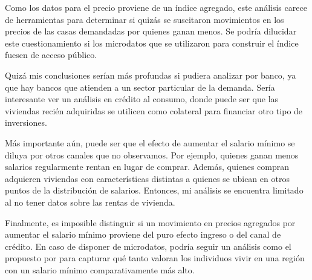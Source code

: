 Como los datos para el precio proviene de un índice agregado, este análisis carece de herramientas para determinar si quizás se suscitaron  movimientos en los precios de las casas demandadas por quienes ganan menos. Se podría dilucidar este cuestionamiento   si los microdatos que se utilizaron para construir el índice fuesen de acceso público.

Quizá mis conclusiones serían más profundas si pudiera analizar por banco, ya que hay bancos que atienden a un sector particular de la demanda. Sería interesante ver un análisis en crédito al consumo, donde puede ser que las viviendas recién adquiridas se utilicen como colateral para financiar otro tipo de inversiones.

Más importante aún, puede ser que el efecto de aumentar el salario mínimo se diluya por otros canales que no observamos. Por ejemplo, quienes ganan menos salarios regularmente rentan en lugar de comprar. Además, quienes compran adquieren viviendas con características distintas a quienes se ubican en otros puntos de la distribución de salarios. Entonces, mi análisis se encuentra limitado al no tener datos sobre las rentas de vivienda.

Finalmente, es imposible distinguir si un movimiento en precios agregados por aumentar el salario mínimo proviene del puro efecto ingreso o del canal de crédito. En caso de disponer de microdatos, podría seguir un análisis como el propuesto por \citep{diamond_2016} para capturar qué tanto valoran los individuos vivir en una región con un salario mínimo comparativamente más alto.
